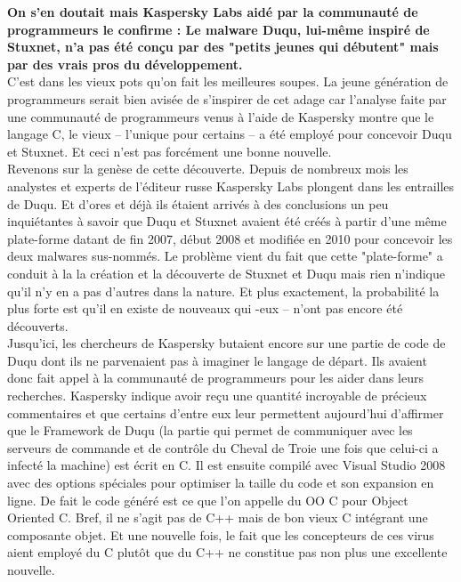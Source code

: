 \documentclass[11pt,twoside,a4paper]{article}
\begin{document}
\textbf{On s'en doutait mais Kaspersky Labs aid{\'e} par la communaut{\'e} de programmeurs le confirme : Le malware Duqu, lui-m{\^e}me inspir{\'e} de Stuxnet, n'a pas {\'e}t{\'e} con\c{c}u par des "petits jeunes qui d{\'e}butent" mais par des vrais pros du d{\'e}veloppement. }~\\

C'est dans les vieux pots qu'on fait les meilleures soupes. La jeune g{\'e}n{\'e}ration de programmeurs serait bien avis{\'e}e de s'inspirer de cet adage car l'analyse faite par une communaut{\'e} de programmeurs venus {\`a} l'aide de Kaspersky montre que le langage C, le vieux --  l'unique pour certains -- a {\'e}t{\'e} employ{\'e} pour concevoir Duqu et Stuxnet. Et ceci n'est pas forc{\'e}ment une bonne nouvelle.~\\

Revenons sur la gen{\`e}se de cette d{\'e}couverte. Depuis de nombreux mois les analystes et experts de l'{\'e}diteur russe Kaspersky Labs plongent dans les entrailles de Duqu. Et d'ores et d{\'e}j{\`a} ils {\'e}taient arriv{\'e}s {\`a} des conclusions un peu inqui{\'e}tantes {\`a} savoir que Duqu et Stuxnet avaient {\'e}t{\'e} cr{\'e}{\'e}s {\`a} partir d'une m{\^e}me plate-forme datant de fin 2007, d{\'e}but 2008 et modifi{\'e}e en 2010 pour concevoir les deux malwares sus-nomm{\'e}s. Le probl{\`e}me vient du fait que cette "plate-forme" a conduit {\`a} la la cr{\'e}ation et la d{\'e}couverte de Stuxnet et Duqu mais rien n'indique qu'il n'y en a pas d'autres dans la nature. Et plus exactement, la probabilit{\'e} la plus forte est qu'il en existe de nouveaux qui -eux -- n'ont pas encore {\'e}t{\'e} d{\'e}couverts.~\\
Jusqu'ici, les chercheurs de Kaspersky butaient encore sur une partie de code de Duqu dont ils ne parvenaient pas {\`a} imaginer le langage de d{\'e}part. Ils avaient donc fait appel {\`a} la communaut{\'e} de programmeurs pour les aider dans leurs recherches. Kaspersky indique avoir re\c{c}u une quantit{\'e} incroyable de pr{\'e}cieux commentaires et que certains d'entre eux leur permettent aujourd'hui d'affirmer que le Framework de Duqu (la partie qui permet de communiquer avec les serveurs de commande et de contr{\^o}le du Cheval de Troie une fois que celui-ci a infect{\'e} la machine) est {\'e}crit en C. Il est ensuite compil{\'e} avec Visual Studio 2008 avec des options sp{\'e}ciales pour optimiser la taille du code et son expansion en ligne. De fait le code g{\'e}n{\'e}r{\'e} est ce que l'on appelle du OO C pour Object Oriented C. Bref, il ne s'agit pas de C++ mais de bon vieux C int{\'e}grant une composante objet. Et une nouvelle fois, le fait que les concepteurs de ces virus aient employ{\'e} du C plut{\^o}t  que du C++ ne constitue pas non plus une excellente nouvelle.~\\
\end{document}
